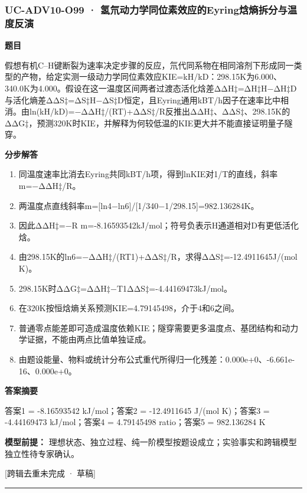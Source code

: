\documentclass[UTF8,11pt,a4paper]{ctexart}
\begin{document}
\subsubsection*{UC-ADV10-O99 · 氢氘动力学同位素效应的Eyring焓熵拆分与温度反演}
\noindent\textbf{题目}\par
假想有机C–H键断裂为速率决定步骤的反应，氘代同系物在相同溶剂下形成同一类型的产物，给定实测一级动力学同位素效应KIE=kH/kD：298.15K为6.000、340.0K为4.000。假设在这一温度区间两者过渡态活化焓差ΔΔH‡=ΔH‡H−ΔH‡D与活化熵差ΔΔS‡=ΔS‡H−ΔS‡D恒定，且Eyring通用kBT/h因子在速率比中相消。由ln(kH/kD)=−ΔΔH‡/(RT)+ΔΔS‡/R反推出ΔΔH‡、ΔΔS‡、298.15K的ΔΔG‡，预测320K时KIE，并解释为何较低温的KIE更大并不能直接证明量子隧穿。\par
\medskip\noindent\textbf{分步解答}
\begin{enumerate}
\item 同温度速率比消去Eyring共同kBT/h项，得到lnKIE对1/T的直线，斜率m=−ΔΔH‡/R。
\item 两温度点直线斜率m=[ln4−ln6]/[1/340−1/298.15]=982.136284K。
\item 因此ΔΔH‡=−R m=-8.16593542kJ/mol；符号负表示H通道相对D有更低活化焓。
\item 由298.15K的ln6=−ΔΔH‡/(RT1)+ΔΔS‡/R，求得ΔΔS‡=-12.4911645J/(mol K)。
\item 298.15K时ΔΔG‡=ΔΔH‡−T1ΔΔS‡=-4.44169473kJ/mol。
\item 在320K按恒焓熵关系预测KIE=4.79145498，介于4和6之间。
\item 普通零点能差即可造成温度依赖KIE；隧穿需要更多温度点、基团结构和动力学证据，不能由两点比值单独证成。
\item 由题设能量、物料或统计分布公式重代所得归一化残差：0.000e+0、-6.661e-16、0.000e+0。
\end{enumerate}
\noindent\textbf{答案摘要}\par
答案1 = -8.16593542 kJ/mol；答案2 = -12.4911645 J/(mol K)；答案3 = -4.44169473 kJ/mol；答案4 = 4.79145498 ratio；答案5 = 982.136284 K\par
\noindent\textbf{模型前提：}
理想状态、独立过程、纯一阶模型按题设成立；实验事实和跨辑模型独立性待专家确认。\par
\noindent\textcolor{red!65!black}{[跨辑去重未完成 · 草稿]} \par
\medskip\hrule\medskip
{}
\end{document}
